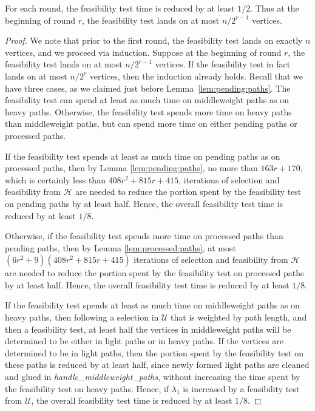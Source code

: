 \begin{lemma}
\label{lem:m:r}
For each round, the feasibility test time is reduced by at least $1/2$. 
Thus at the beginning of round $r$, the feasibility test lands on at most $n/2^{r-1}$ vertices.
\end{lemma}
\begin{proof}
We note that prior to the first round, the feasibility test lands on exactly $n$ vertices, and we proceed via induction. 
Suppose at the beginning of round $r$, the feasibility test lands on at most $n/2^{r-1}$ vertices. 
If the feasibility test in fact lands on at most $n/2^r$ vertices, then the induction already holds. 
Recall that we have three cases, as we claimed just before Lemma~\ref{lem:pending:paths}. 
The feasibility test can spend at least as much time on middleweight paths as on heavy paths. 
Otherwise, the feasibility test spends more time on heavy paths than middleweight paths, but can spend more time on either pending paths or processed paths.  

If the feasibility test spends at least as much time on pending paths as on processed paths, then by Lemma \ref{lem:pending:paths}, no more than $163r+170$, which is certainly less than $408r^2+815r+415$, iterations of selection and feasibility from $\mathcal{H}$ are needed to reduce the portion spent by the feasibility test on pending paths by at least half. 
Hence, the overall feasibility test time is reduced by at least $1/8$.

Otherwise, if the feasibility test spends more time on processed paths than pending paths, then by Lemma \ref{lem:processed:paths}, at most $(6r^2+9)(408r^2+815r+415)$ iterations of selection and feasibility from $\mathcal{H}$ are needed to reduce the portion spent by the feasibility test on processed paths by at least half. 
Hence, the overall feasibility test time is reduced by at least $1/8$.

If the feasibility test spends at least as much time on middleweight paths as on heavy paths, then following a selection in $\mathcal{U}$ that is weighted by path length, and then a feasibility test, at least half the vertices in middleweight paths will be determined to be either in light paths or in heavy paths. 
If the vertices are determined to be in light paths, then the portion spent by the feasibility test on these paths is reduced by at least half, since newly formed light paths are cleaned and glued in \emph{handle\_middleweight\_paths}, without increasing the time spent by the feasibility test on heavy paths. 
Hence, if $\lambda_1$ is increased by a feasibility test from $\mathcal{U}$, the overall feasibility test time is reduced by at least $1/8$. 


\end{proof}
